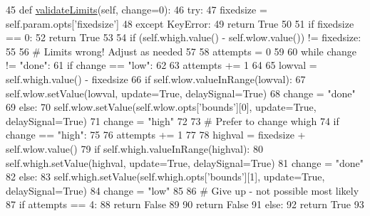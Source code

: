 \begin{DoxyCode}
45     \textcolor{keyword}{def }\hyperlink{classsoftware_1_1chipwhisperer_1_1common_1_1ui_1_1ParameterTypesCustom_1_1RangeParameterItem_af35a37706922bbc341046fdad72211d5}{validateLimits}(self, change=0):
46         \textcolor{keywordflow}{try}:
47             fixedsize = self.param.opts[\textcolor{stringliteral}{'fixedsize'}]
48         \textcolor{keywordflow}{except} KeyError:
49             \textcolor{keywordflow}{return} \textcolor{keyword}{True}
50 
51         \textcolor{keywordflow}{if} fixedsize == 0:
52             \textcolor{keywordflow}{return} \textcolor{keyword}{True}
53 
54         \textcolor{keywordflow}{if} (self.whigh.value() - self.wlow.value()) != fixedsize:
55 
56             \textcolor{comment}{# Limits wrong! Adjust as needed}
57 
58             attempts = 0
59 
60             \textcolor{keywordflow}{while} change != \textcolor{stringliteral}{"done"}:
61                 \textcolor{keywordflow}{if} change == \textcolor{stringliteral}{"low"}:
62 
63                     attempts += 1
64 
65                     lowval = self.whigh.value() - fixedsize
66                     \textcolor{keywordflow}{if} self.wlow.valueInRange(lowval):
67                         self.wlow.setValue(lowval, update=\textcolor{keyword}{True}, delaySignal=\textcolor{keyword}{True})
68                         change = \textcolor{stringliteral}{"done"}
69                     \textcolor{keywordflow}{else}:
70                         self.wlow.setValue(self.wlow.opts[\textcolor{stringliteral}{'bounds'}][0], update=\textcolor{keyword}{True}, delaySignal=\textcolor{keyword}{True})
71                         change = \textcolor{stringliteral}{"high"}
72 
73                 \textcolor{comment}{# Prefer to change whigh}
74                 \textcolor{keywordflow}{if} change == \textcolor{stringliteral}{"high"}:
75 
76                     attempts += 1
77 
78                     highval = fixedsize + self.wlow.value()
79                     \textcolor{keywordflow}{if} self.whigh.valueInRange(highval):
80                         self.whigh.setValue(highval, update=\textcolor{keyword}{True}, delaySignal=\textcolor{keyword}{True})
81                         change = \textcolor{stringliteral}{"done"}
82                     \textcolor{keywordflow}{else}:
83                         self.whigh.setValue(self.whigh.opts[\textcolor{stringliteral}{'bounds'}][1], update=\textcolor{keyword}{True}, delaySignal=\textcolor{keyword}{True})
84                         change = \textcolor{stringliteral}{"low"}
85 
86                 \textcolor{comment}{# Give up - not possible most likely}
87                 \textcolor{keywordflow}{if} attempts == 4:
88                     \textcolor{keywordflow}{return} \textcolor{keyword}{False}
89 
90             \textcolor{keywordflow}{return} \textcolor{keyword}{False}
91         \textcolor{keywordflow}{else}:
92             \textcolor{keywordflow}{return} \textcolor{keyword}{True}
93 
\end{DoxyCode}
